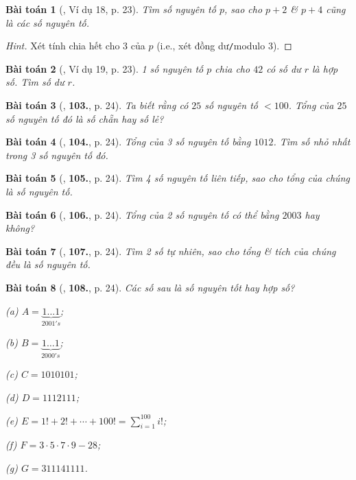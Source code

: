 \documentclass{article}
\numberwithin{equation}{section}
\newtheorem{baitoan}{Bài toán}[section]
\begin{document}
\begin{baitoan}[\cite{Binh_Toan_6_tap_1}, Ví dụ 18, p. 23]
	Tìm số nguyên tố $p$, sao cho $p + 2$ \& $p + 4$ cũng là các số nguyên tố.
\end{baitoan}

\begin{proof}[Hint]
	Xét tính chia hết cho $3$ của $p$ (i.e., xét đồng dư\texttt{/}modulo $3$).
\end{proof}

\begin{baitoan}[\cite{Binh_Toan_6_tap_1}, Ví dụ 19, p. 23]
	1 số nguyên tố $p$ chia cho $42$ có số dư $r$ là hợp số. Tìm số dư $r$.
\end{baitoan}

\begin{baitoan}[\cite{Binh_Toan_6_tap_1}, \textbf{103.}, p. 24]
	Ta biết rằng có $25$ số nguyên tố $< 100$. Tổng của $25$ số nguyên tố đó là số chẵn hay số lẻ?
\end{baitoan}

\begin{baitoan}[\cite{Binh_Toan_6_tap_1}, \textbf{104.}, p. 24]
	Tổng của 3 số nguyên tố bằng $1012$. Tìm số nhỏ nhất trong 3 số nguyên tố đó.
\end{baitoan}

\begin{baitoan}[\cite{Binh_Toan_6_tap_1}, \textbf{105.}, p. 24]
	Tìm 4 số nguyên tố liên tiếp, sao cho tổng của chúng là số nguyên tố.
\end{baitoan}

\begin{baitoan}[\cite{Binh_Toan_6_tap_1}, \textbf{106.}, p. 24]
	Tổng của 2 số nguyên tố có thể bằng $2003$ hay không?
\end{baitoan}

\begin{baitoan}[\cite{Binh_Toan_6_tap_1}, \textbf{107.}, p. 24]
	Tìm 2 số tự nhiên, sao cho tổng \& tích của chúng đều là số nguyên tố.
\end{baitoan}

\begin{baitoan}[\cite{Binh_Toan_6_tap_1}, \textbf{108.}, p. 24]
	Các số sau là số nguyên tốt hay hợp số?
	\begin{enumerate*}
		\item[(a)] $A = \underbrace{1\ldots 1}_{2001's}$;
		\item[(b)] $B = \underbrace{1\ldots 1}_{2000's}$;
		\item[(c)] $C = 1010101$;
		\item[(d)] $D = 1112111$;
		\item[(e)] $E = 1! + 2! + \cdots + 100! = \sum_{i=1}^{100} i!$;
		\item[(f)] $F = 3\cdot 5\cdot 7\cdot 9 - 28$;
		\item[(g)] $G = 311141111$.
	\end{enumerate*}
\end{baitoan}
\end{document}
